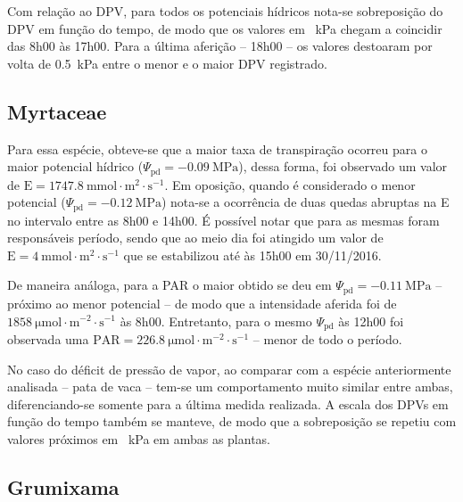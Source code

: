 \documentclass[a4paper, 12pt]{article}
\numberwithin{equation}{section}
\begin{document}
	Com relação ao DPV, para todos os potenciais hídricos nota-se sobreposição do DPV em função do tempo, de modo que os valores em \SI{}{\kilo\pascal} chegam a coincidir das 8h00 às 17h00. Para a última aferição -- 18h00 -- os valores destoaram por volta de \SI{0.5}{\kilo\pascal} entre o menor e o maior DPV registrado.
	
	\subsection{Myrtaceae}
	
	Para essa espécie, obteve-se que a maior taxa de transpiração ocorreu para o maior potencial hídrico ($\Psi_{\textrm{pd}}=\SI{-0.09}{\mega\pascal}$), dessa forma, foi observado um valor de $\textrm{E}=\SI{1747.8}{\milli\mole\cdot\meter^{2}\cdot\second^{-1}}$. Em oposição, quando é considerado o menor potencial ($\Psi_{\textrm{pd}}=\SI{-0.12}{\mega\pascal}$) nota-se a ocorrência de duas quedas abruptas na E no intervalo entre as 8h00 e 14h00. É possível notar que para as mesmas foram responsáveis período, sendo que ao meio dia foi atingido um valor de $\textrm{E}=\SI{4}{\milli\mole\cdot\meter^{2}\cdot\second^{-1}}$ que se estabilizou até às 15h00 em 30/11/2016.
	
	De maneira análoga, para a PAR o maior obtido se deu em $\Psi_{\textrm{pd}}=\SI{-0.11}{\mega\pascal}$ -- próximo ao menor potencial -- de modo que a intensidade aferida foi de $\SI{1858}{\micro\mole\cdot\meter^{-2}\cdot\second^{-1}}$ às 8h00. Entretanto, para o mesmo $\Psi_{\textrm{pd}}$ às 12h00 foi observada uma 
	$\textrm{PAR}=\SI{226.8}{\micro\mole\cdot\meter^{-2}\cdot\second^{-1}}$ -- menor de todo o período.	
	
	No caso do déficit de pressão de vapor, ao comparar com a espécie anteriormente analisada -- pata de vaca -- tem-se um comportamento muito similar entre ambas, diferenciando-se somente para a última medida realizada. A escala dos DPVs em função do tempo também se manteve, de modo que a sobreposição se repetiu com valores próximos em \SI{}{\kilo\pascal} em ambas as plantas.
	
	\subsection{Grumixama}
	
\end{document}
